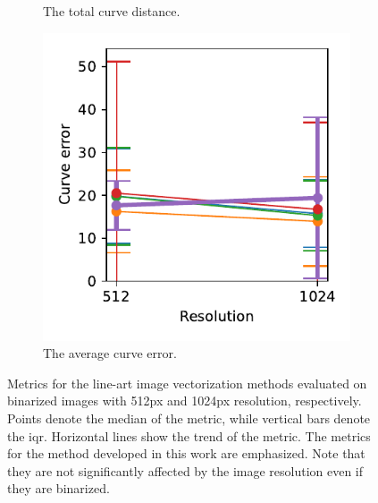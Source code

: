 \begin{figure}[!h]
\begin{subfigure}{.3\textwidth}
    \caption{The total curve distance.}
\end{subfigure}
    \begin{subfigure}{.3\textwidth}
    \centering
    \includegraphics[width=\textwidth]{graphics/eval/curve error_1024-1.024_True_tonari.pdf}
    \caption{The average curve error.}
\end{subfigure}
    \caption{Metrics for the line-art image vectorization methods evaluated on binarized images with 512px and 1024px resolution, respectively. Points denote the median of the metric, while vertical bars denote the \gls{iqr}. Horizontal lines show the trend of the metric. The metrics for the method developed in this work are emphasized. Note that they are not significantly affected by the image resolution even if they are binarized.}
    \label{fig:metric_1024_True_tonari}
\end{figure}

